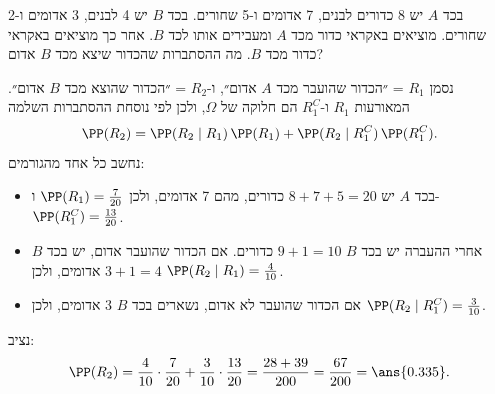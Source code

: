 בכד $A$ יש 8 כדורים לבנים, 7 אדומים ו-5 שחורים. בכד $B$ יש 4 לבנים, 3 אדומים ו-2 שחורים. מוציאים באקראי כדור מכד $A$ ומעבירים אותו לכד $B$. אחר כך מוציאים באקראי כדור מכד $B$. מה ההסתברות שהכדור שיצא מכד $B$ אדום?
\begin{solbox}
נסמן $R_1$ = ״הכדור שהועבר מכד $A$ אדום״, ו-$R_2$ = ״הכדור שהוצא מכד $B$ אדום״. המאורעות $R_1$ ו-$R_1^C$ הם חלוקה של $\Omega$, ולכן לפי נוסחת ההסתברות השלמה
\[
\PP(R_2)=\PP(R_2\mid R_1)\,\PP(R_1)+\PP(R_2\mid R_1^C)\,\PP(R_1^C).
\]
נחשב כל אחד מהגורמים:
\begin{itemize}
\item בכד $A$ יש $8+7+5=20$ כדורים, מהם 7 אדומים, ולכן $\PP(R_1)=\frac7{20}$ ו-$\PP(R_1^C)=\frac{13}{20}$.
\item אחרי ההעברה יש בכד $B$ $9+1=10$ כדורים. אם הכדור שהועבר אדום, יש בכד $B$ $3+1=4$ אדומים, ולכן $\PP(R_2\mid R_1)=\frac4{10}$.
\item אם הכדור שהועבר לא אדום, נשארים בכד $B$ 3 אדומים, ולכן $\PP(R_2\mid R_1^C)=\frac3{10}$.
\end{itemize}
נציב:
\[
\PP(R_2)=\frac4{10}\cdot\frac7{20}+\frac3{10}\cdot\frac{13}{20}=\frac{28+39}{200}=\frac{67}{200}=\ans{0.335}.
\]
\end{solbox}
